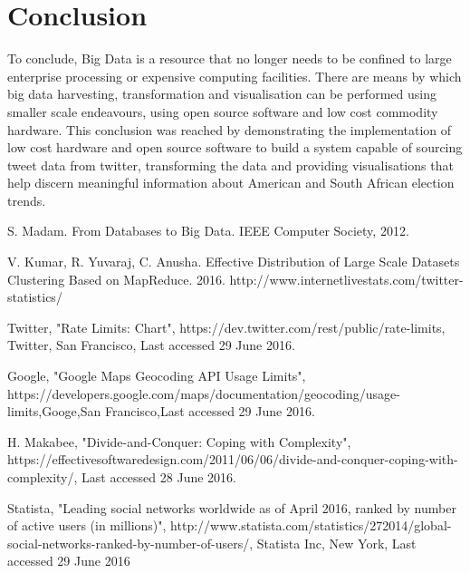\documentclass[12pt]{article} %
\begin{document}
	\section{Conclusion} %
	
	To conclude, Big Data is a resource that no longer needs to be confined to large enterprise processing or expensive computing facilities. There are means by which big data harvesting, transformation and visualisation can be performed using smaller scale endeavours, using open source software and low cost commodity hardware. This conclusion was reached by demonstrating the implementation of low cost hardware and open source software to build a system capable of sourcing tweet data from twitter, transforming the data and providing visualisations that help discern meaningful information about American and South African election trends.
	
	\newpage
	
	
	\begin{thebibliography}{99} %
		
		 S. Madam. From Databases to Big Data. IEEE Computer Society, 2012.
	
		
		 V. Kumar, R. Yuvaraj, C. Anusha. Effective Distribution of Large Scale Datasets Clustering Based on MapReduce. 2016.
		 http://www.internetlivestats.com/twitter-statistics/
		
		 Twitter, "Rate Limits: Chart", https://dev.twitter.com/rest/public/rate-limits, Twitter, San Francisco, Last accessed 29 June 2016.
		
		 Google, "Google Maps Geocoding API Usage Limits", https://developers.google.com/maps/documentation/geocoding/usage-limits,Googe,San Francisco,Last accessed 29 June 2016.
		
		 H. Makabee, "Divide-and-Conquer: Coping with Complexity", https://effectivesoftwaredesign.com/2011/06/06/divide-and-conquer-coping-with-complexity/, Last accessed 28 June 2016.
		
		 Statista, "Leading social networks worldwide as of April 2016, ranked by number of active users (in millions)", 
		http://www.statista.com/statistics/272014/global-social-networks-ranked-by-number-of-users/, Statista Inc, New York, Last accessed 29 June 2016
		
		
		
		

		
	\end{thebibliography}
	\newpage
	
\end{document}
